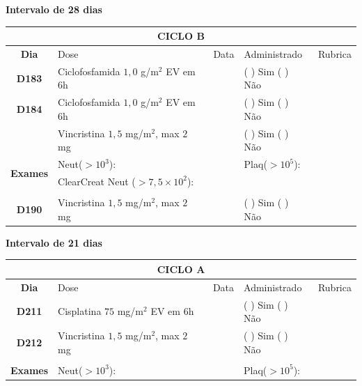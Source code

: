 \documentclass[11pt,a4paper,oldfontcommands]{memoir}
\begin{document}
\begin{center}
    \textbf{Intervalo de 28 dias}
    \begin{table}[H]
    \begin{tabular}{p{1cm}p{6cm}|p{1cm}|p{3cm}|p{2.5cm}}
    \hline
	\multicolumn{5}{c}{\textbf{CICLO B}}\\
	\hline
    \multicolumn{1}{c|}{\multirow{1}{*}{\textbf{Dia}}}&{Dose}&{Data}&{Administrado}&{Rubrica} \\
    \hline
    \multicolumn{1}{c|}{\multirow{1}{*}{\textbf{D183}}}&{Ciclofosfamida \(1,0\) g/m\(^2\) EV em 6h}&&{(  ) Sim (  ) Não}&\\
    \multicolumn{1}{c|}{\multirow{1}{*}{\textbf{D184}}}&{Ciclofosfamida \(1,0\) g/m\(^2\) EV em 6h}&&{(  ) Sim (  ) Não}&\\
    \multicolumn{1}{c|}{\multirow{1}{*}{\textbf{}}}&{Vincristina \(1,5\) mg/m\(^2\), max \(2\) mg}&&{(  ) Sim (  ) Não}&\\
    \hline
    \multicolumn{1}{c|}{\multirow{2}{*}{\textbf{Exames}}}&\multicolumn{2}{l|}{Neut(\(>10^3\)):}&{Plaq(\(>10^5\)):}&\\
    \cline{2-5}
    \multicolumn{1}{c|}{\multirow{2}{*}{{}}}&\multicolumn{2}{l|}{ClearCreat Neut (\(>7,5\times10^2\)):}&{}&{}\\
    \hline
    \\
    \hline
    \multicolumn{1}{c|}{\multirow{1}{*}{\textbf{D190}}}&{Vincristina \(1,5\) mg/m\(^2\), max \(2\) mg}&&{(  ) Sim (  ) Não}&\\
    \hline
\end{tabular}
\end{table}
\textbf{Intervalo de 21 dias}
\begin{table}[H]
\begin{tabular}{p{1cm}p{6cm}|p{1cm}|p{3cm}|p{2.5cm}}
	\hline
	\multicolumn{5}{c}{\textbf{CICLO A}}\\
\hline
    \multicolumn{1}{c|}{\multirow{1}{*}{\textbf{Dia}}}&{Dose}&{Data}&{Administrado}&{Rubrica} \\
    \hline
    \multicolumn{1}{c|}{\multirow{1}{*}{\textbf{D211}}}&{Cisplatina \(75\) mg/m\(^2\) EV em 6h}&&{(  ) Sim (  ) Não}&\\
    \multicolumn{1}{c|}{\multirow{1}{*}{\textbf{D212}}}&{Vincristina \(1,5\) mg/m\(^2\), max \(2\) mg}&&{(  ) Sim (  ) Não}&\\
    \multicolumn{1}{c|}{\multirow{1}{*}{\textbf{}}}&&&&\\
    \hline
    \multicolumn{1}{c|}{\multirow{2}{*}{\textbf{Exames}}}&\multicolumn{2}{l|}{Neut(\(>10^3\)):}&{Plaq(\(>10^5\)):}&\\

\end{tabular}
\end{table}
\end{center}
\end{document}
